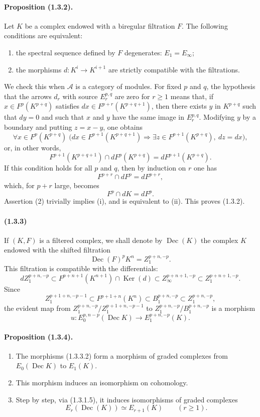 \documentclass[10pt]{article}
\newcommand{\Ker}{\operatorname{Ker}}
\newcommand{\calA}{\mathcal A}
\newcommand{\Dec}{\operatorname{Dec}}
\begin{document}
\paragraph{Proposition (1.3.2).} Let $K$ be a complex endowed with a biregular filtration $F$. The following conditions are equivalent:
\begin{enumerate}[label=(\roman*)]
\item the spectral sequence defined by $F$ degenerates: $E_1=E_\infty$;
\item the morphisms $d:K^i\to K^{i+1}$ are strictly compatible with the filtrations.
\end{enumerate}
We check this when $\calA$ is a category of modules. For fixed $p$ and $q$, the hypothesis that the arrows $d_r$ with source $E_r^{p,q}$ are zero for $r\geq1$ means that, if $x\in F^p(K^{p+q})$ satisfies $dx\in F^{p+r}(K^{p+q+1})$, then there exists $y$ in $K^{p+q}$ such that $dy=0$ and such that $x$ and $y$ have the same image in $E_r^{p,q}$. Modifying $y$ by a boundary and putting $z=x-y$, one obtains
\[
\forall x\in F^p(K^{p+q})\;\bigl(dx\in F^{p+1}(K^{p+q+1})\Rightarrow
\exists z\in F^{p+1}(K^{p+q}),\ dz=dx\bigr),
\]
or, in other words,
\[
\tag{1}
F^{p+1}(K^{p+q+1})\cap dF^p(K^{p+q})=dF^{p+1}(K^{p+q}).
\]
If this condition holds for all $p$ and $q$, then by induction on $r$ one has
\[
F^{p+r}\cap dF^p=dF^{p+r},
\]
which, for $p+r$ large, becomes
\[
\tag{2}
F^p\cap dK=dF^p.
\]
Assertion (2) trivially implies (i), and is equivalent to (ii). This proves (1.3.2).

\paragraph{(1.3.3)} If $(K,F)$ is a filtered complex, we shall denote by $\Dec(K)$ the complex $K$ endowed with the shifted filtration
\[
\Dec(F)^pK^n=Z_1^{p+n,-p}.
\]
This filtration is compatible with the differentials:
\[
dZ_1^{p+n,-p}\subset F^{p+n+1}(K^{n+1})\cap\Ker(d)
       \subset Z_\infty^{p+n+1,-p}\subset Z_1^{p+n+1,-p}.
\]
Since
\[
\tag{1.3.3.1}
Z_1^{p+1+n,-p-1}\subset F^{p+1+n}(K^n)\subset B_1^{p+n,-p}\subset Z_1^{p+n,-p},
\]
the evident map from $Z_1^{p+n,-p}/Z_1^{p+1+n,-p-1}$ to $Z_1^{p+n,-p}/B_1^{p+n,-p}$ is a morphism
\[
\tag{1.3.3.2}
u:E_0^{p,n-p}(\Dec K)\longrightarrow E_1^{p+n,-p}(K).
\]

\paragraph{Proposition (1.3.4).}
\begin{enumerate}[label=(\roman*)]
\item The morphisms (1.3.3.2) form a morphism of graded complexes from $E_0(\Dec K)$ to $E_1(K)$.
\item This morphism induces an isomorphism on cohomology.
\item Step by step, via (1.3.1.5), it induces isomorphisms of graded complexes
\[
E_r(\Dec(K))\simeq E_{r+1}(K)\qquad(r\ge1).
\]
\end{enumerate}
\end{document}
